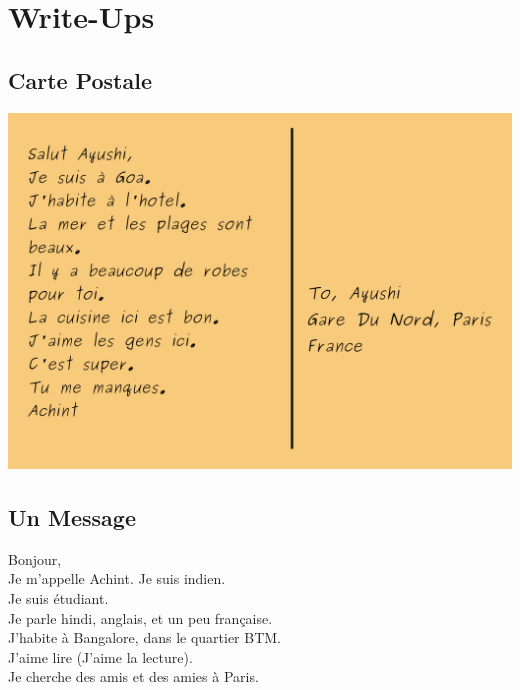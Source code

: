 \section{Write-Ups}

\subsection{Carte Postale}
\includegraphics[width=\textwidth]{images/PostCard.png}

\subsection{Un Message}
Bonjour,\\
Je m'appelle Achint. Je suis indien.\\
Je suis \'etudiant. \\
Je parle hindi, anglais, et un peu fran\c{c}aise.\\
J'habite \`a Bangalore, dans le quartier BTM.\\
J'aime lire (J'aime la lecture).\\
Je cherche des amis et des amies \`a Paris.\\
